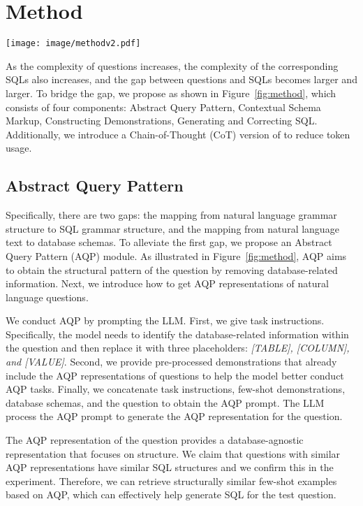\section{Method}

\begin{figure*}[htbp]
    \centering
    \texttt{[image: image/methodv2.pdf]}
    \caption{Overall framework of proposed \model.}
    \label{fig:method}
    \vspace{-4mm}
\end{figure*}


As the complexity of questions increases, the complexity of the corresponding SQLs also increases, and the gap between questions and SQLs becomes larger and larger. To bridge the gap, we propose \model as shown in Figure~\ref{fig:method}, which consists of four components: Abstract Query Pattern, Contextual Schema Markup, Constructing Demonstrations, Generating and Correcting SQL.
Additionally, we introduce a Chain-of-Thought (CoT) version of \model to reduce token usage.


\subsection{Abstract Query Pattern}
\label{method_AQP}

Specifically, there are two gaps: the mapping from natural language grammar structure to SQL grammar structure, and the mapping from natural language text to database schemas. 
To alleviate the first gap, we propose an Abstract Query Pattern (AQP) module. As illustrated in Figure~\ref{fig:method}, AQP aims to obtain the structural pattern of the question by removing database-related information. Next, we introduce how to get AQP representations of natural language questions. 

We conduct AQP by prompting the LLM. 
First, we give task instructions. Specifically, the model needs to identify the database-related information within the question and then replace it with three placeholders: \textit{[TABLE], [COLUMN], and [VALUE]}. 
Second, we provide pre-processed demonstrations that already include the AQP representations of questions to help the model better conduct AQP tasks. 
Finally, we concatenate task instructions, few-shot demonstrations, database schemas, and the question to obtain the AQP prompt.
The LLM process the AQP prompt to generate the AQP representation for the question.

The AQP representation of the question provides a database-agnostic representation that focuses on structure.
We claim that questions with similar AQP representations have similar SQL structures and we confirm this in the experiment. 
Therefore, we can retrieve structurally similar few-shot examples based on AQP, which can effectively help generate SQL for the test question.

